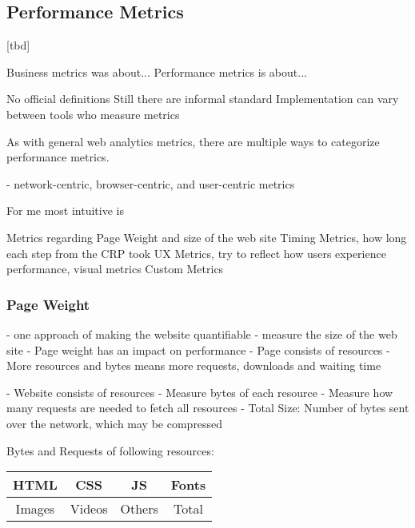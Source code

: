 


\subsection{Performance Metrics}


[tbd]


Business metrics was about...
Performance metrics is about...

No official definitions
Still there are informal standard
Implementation can vary between tools who measure metrics



As with general web analytics metrics, there are multiple ways to categorize performance metrics.

- network-centric, browser-centric, and user-centric metrics

For me most intuitive is

Metrics regarding Page Weight and size of the web site
Timing Metrics, how long each step from the CRP took
UX Metrics, try to reflect how users experience performance, visual metrics
Custom Metrics







\subsubsection{Page Weight}


- one approach of making the website quantifiable
- measure the size of the web site
- Page weight has an impact on performance
- Page consists of resources
- More resources and bytes means more requests, downloads and waiting time


- Website consists of resources
- Measure bytes of each resource
- Measure how many requests are needed to fetch all resources
- Total Size: Number of bytes sent over the network, which may be compressed

Bytes and Requests of following resources:

\begin{center}
\begin{tabular}{| c | c | c | c | }
\hline
HTML & CSS  & JS & Fonts \\
\hline
Images & Videos & Others & Total \\
\hline
\end{tabular}
\end{center}

